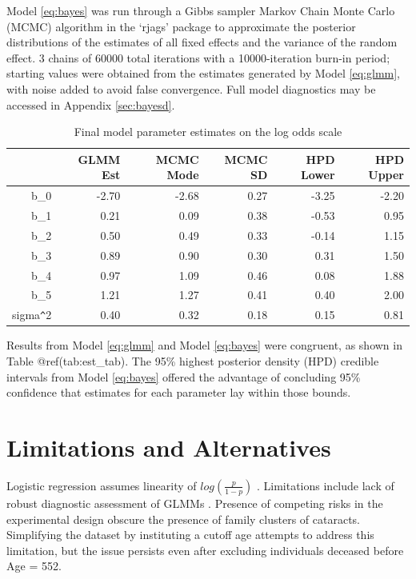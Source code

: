 \documentclass[12pt]{article}
\begin{document}
Model \eqref{eq:bayes} was run through a Gibbs sampler Markov Chain Monte Carlo (MCMC) algorithm in the `rjags' package \citep{R-rjags} to approximate the posterior distributions of the estimates of all fixed effects and the variance of the random effect. 3 chains of 60000 total iterations with a 10000-iteration burn-in period; starting values were obtained from the estimates generated by Model \eqref{eq:glmm}, with noise added to avoid false convergence. Full model diagnostics may be accessed in Appendix \ref{sec:bayesd}.

\begin{table}[H]
\centering
\begin{tabular}{rrrrrr}
  \toprule
 & GLMM Est & MCMC Mode & MCMC SD & HPD Lower & HPD Upper \\ 
  \midrule
b\_0 & -2.70 & -2.68 & 0.27 & -3.25 & -2.20 \\ 
  b\_1 & 0.21 & 0.09 & 0.38 & -0.53 & 0.95 \\ 
  b\_2 & 0.50 & 0.49 & 0.33 & -0.14 & 1.15 \\ 
  b\_3 & 0.89 & 0.90 & 0.30 & 0.31 & 1.50 \\ 
  b\_4 & 0.97 & 1.09 & 0.46 & 0.08 & 1.88 \\ 
  b\_5 & 1.21 & 1.27 & 0.41 & 0.40 & 2.00 \\ 
  sigma\verb|^|2 & 0.40 & 0.32 & 0.18 & 0.15 & 0.81 \\ 
   \bottomrule
\end{tabular}
\caption{Final model parameter estimates on the log odds scale} 
\label{tab:est_tab}
\end{table}

Results from Model \eqref{eq:glmm} and Model \eqref{eq:bayes} were congruent, as shown in Table @ref(tab:est\_tab). The 95\% highest posterior density (HPD) credible intervals from Model \eqref{eq:bayes} offered the advantage of concluding 95\% confidence that estimates for each parameter lay within those bounds.

\section{Limitations and Alternatives}
\label{sec:limits}

Logistic regression assumes linearity of \(log(\frac{p}{1-p})\) \citep{BMLR2021}.
Limitations include lack of robust diagnostic assessment of GLMMs \citep{CDA}.
Presence of competing risks in the experimental design obscure the presence of family clusters of cataracts. Simplifying the dataset by instituting a cutoff age attempts to address this limitation, but the issue persists even after excluding individuals deceased before Age = 552.
\end{document}
